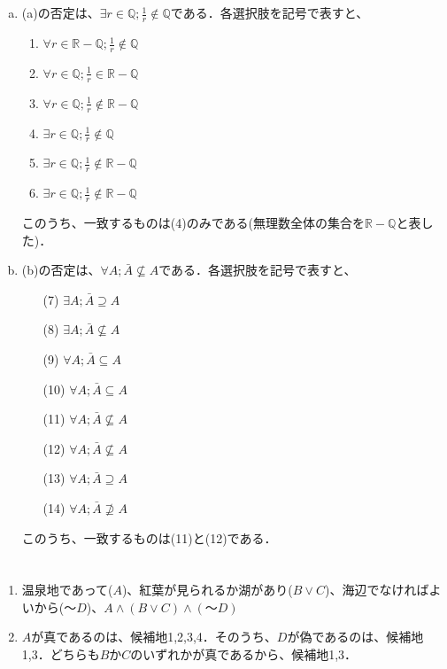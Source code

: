 \documentclass[a4paper,12pt]{ltjsarticle}
\begin{document}
\section{}
\begin{enumerate}[(a)]
    \item (a)の否定は、$\exists r \in \mathbb{Q} ; \frac{1}{r} \notin \mathbb{Q}$である．各選択肢を記号で表すと、
        \begin{enumerate}[(1)]
            \item $\forall r \in \mathbb{R} - \mathbb{Q} ; \frac{1}{r} \notin \mathbb{Q}$
            \item $\forall r \in \mathbb{Q} ; \frac{1}{r} \in \mathbb{R} - \mathbb{Q}$
            \item $\forall r \in \mathbb{Q} ; \frac{1}{r} \notin \mathbb{R} - \mathbb{Q}$
            \item $\exists r \in \mathbb{Q} ; \frac{1}{r} \notin \mathbb{Q}$
            \item $\exists r \in \mathbb{Q} ; \frac{1}{r} \notin \mathbb{R} - \mathbb{Q}$
            \item $\exists r \in \mathbb{Q} ; \frac{1}{r} \notin \mathbb{R} - \mathbb{Q}$
        \end{enumerate}
        このうち、一致するものは(4)のみである(無理数全体の集合を$\mathbb{R} - \mathbb{Q}$と表した)．
    \item (b)の否定は、$\forall A ; \bar{A} \nsubseteq A$である．各選択肢を記号で表すと、
        \begin{enumerate}
            \item[(7)] $\exists A ; \bar{A} \supseteq A$
            \item[(8)] $\exists A ; \bar{A} \nsubseteq A$
            \item[(9)] $\forall A ; \bar{A} \subseteq A$
            \item[(10)] $\forall A ; \bar{A} \subseteq A$
            \item[(11)] $\forall A ; \bar{A} \nsubseteq A$
            \item[(12)] $\forall A ; \bar{A} \nsubseteq A$
            \item[(13)] $\forall A ; \bar{A} \supseteq A$
            \item[(14)] $\forall A ; \bar{A} \nsupseteq A$
        \end{enumerate}
        このうち、一致するものは(11)と(12)である．
\end{enumerate}

\section{}
\begin{enumerate}[(1)]
    \item 温泉地であって($A$)、紅葉が見られるか湖があり($B \lor C$)、海辺でなければよいから($〜D$)、$A \land (B \lor C) \land (〜D)$
    \item $A$が真であるのは、候補地1,2,3,4．そのうち、$D$が偽であるのは、候補地1,3．どちらも$B$か$C$のいずれかが真であるから、候補地1,3．
\end{enumerate}
\end{document}
